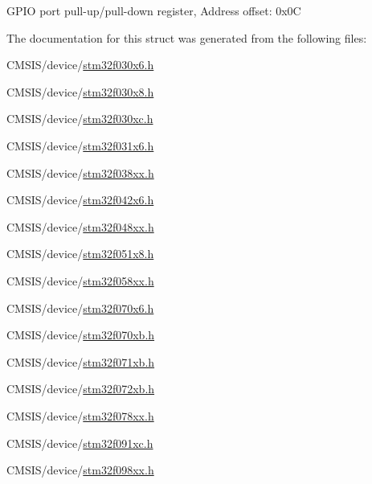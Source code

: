 G\+P\+IO port pull-\/up/pull-\/down register, Address offset\+: 0x0C 

The documentation for this struct was generated from the following files\+:\begin{DoxyCompactItemize}
\item 
C\+M\+S\+I\+S/device/\hyperlink{stm32f030x6_8h}{stm32f030x6.\+h}\item 
C\+M\+S\+I\+S/device/\hyperlink{stm32f030x8_8h}{stm32f030x8.\+h}\item 
C\+M\+S\+I\+S/device/\hyperlink{stm32f030xc_8h}{stm32f030xc.\+h}\item 
C\+M\+S\+I\+S/device/\hyperlink{stm32f031x6_8h}{stm32f031x6.\+h}\item 
C\+M\+S\+I\+S/device/\hyperlink{stm32f038xx_8h}{stm32f038xx.\+h}\item 
C\+M\+S\+I\+S/device/\hyperlink{stm32f042x6_8h}{stm32f042x6.\+h}\item 
C\+M\+S\+I\+S/device/\hyperlink{stm32f048xx_8h}{stm32f048xx.\+h}\item 
C\+M\+S\+I\+S/device/\hyperlink{stm32f051x8_8h}{stm32f051x8.\+h}\item 
C\+M\+S\+I\+S/device/\hyperlink{stm32f058xx_8h}{stm32f058xx.\+h}\item 
C\+M\+S\+I\+S/device/\hyperlink{stm32f070x6_8h}{stm32f070x6.\+h}\item 
C\+M\+S\+I\+S/device/\hyperlink{stm32f070xb_8h}{stm32f070xb.\+h}\item 
C\+M\+S\+I\+S/device/\hyperlink{stm32f071xb_8h}{stm32f071xb.\+h}\item 
C\+M\+S\+I\+S/device/\hyperlink{stm32f072xb_8h}{stm32f072xb.\+h}\item 
C\+M\+S\+I\+S/device/\hyperlink{stm32f078xx_8h}{stm32f078xx.\+h}\item 
C\+M\+S\+I\+S/device/\hyperlink{stm32f091xc_8h}{stm32f091xc.\+h}\item 
C\+M\+S\+I\+S/device/\hyperlink{stm32f098xx_8h}{stm32f098xx.\+h}\end{DoxyCompactItemize}
